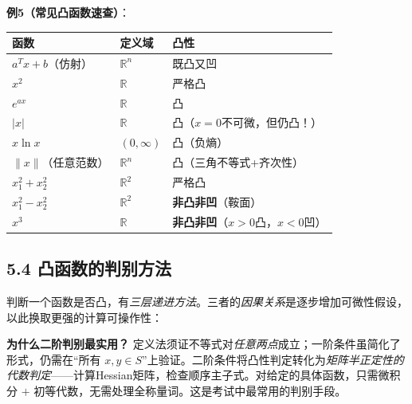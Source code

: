 \textbf{例5（常见凸函数速查）}：

{\small
\begin{tabular}{@{}lll@{}}
\toprule
\textbf{函数} & \textbf{定义域} & \textbf{凸性} \\
\midrule
$a^T x+b$（仿射） & $\mathbb{R}^n$ & 既凸又凹 \\
$x^2$    & $\mathbb{R}$   & 严格凸 \\
$e^{ax}$ & $\mathbb{R}$   & 凸 \\
$|x|$    & $\mathbb{R}$   & 凸（$x=0$不可微，但仍凸！） \\
$x\ln x$ & $(0,\infty)$   & 凸（负熵） \\
$\|x\|$（任意范数）& $\mathbb{R}^n$ & 凸（三角不等式+齐次性）\\
$x_1^2+x_2^2$ & $\mathbb{R}^2$ & 严格凸 \\
$x_1^2-x_2^2$ & $\mathbb{R}^2$ & \textbf{非凸非凹}（鞍面） \\
$x^3$    & $\mathbb{R}$   & \textbf{非凸非凹}（$x>0$凸，$x<0$凹）\\
\bottomrule
\end{tabular}
}

\bigskip

\subsection{5.4 凸函数的判别方法}

判断一个函数是否凸，有\emph{三层递进方法}。三者的\emph{因果关系}是逐步增加可微性假设，以此换取更强的计算可操作性：

\begin{center}
\end{center}

\textbf{为什么二阶判别最实用？} 定义法须证不等式对\emph{任意两点}成立；一阶条件虽简化了形式，仍需在“所有 $x,y\in S$”上验证。二阶条件将凸性判定转化为\emph{矩阵半正定性的代数判定}——计算Hessian矩阵，检查顺序主子式。对给定的具体函数，只需微积分 $+$ 初等代数，无需处理全称量词。这是考试中最常用的判别手段。


